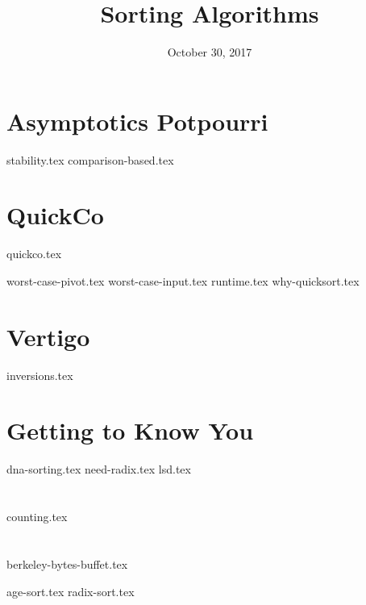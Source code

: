 \documentclass[11pt]{exam}
\title{Sorting Algorithms}
\date{October 30, 2017}
\begin{document}
\maketitle

\section{Asymptotics Potpourri}
{stability.tex}
{comparison-based.tex}

\section{QuickCo}
{quickco.tex}
\begin{questions}
{worst-case-pivot.tex}
{worst-case-input.tex}
{runtime.tex}
{why-quicksort.tex}
\end{questions}

\section{Vertigo}
\begin{questions}
{inversions.tex}
\end{questions}

\clearpage

\section{Getting to Know You}
\begin{questions}
{dna-sorting.tex}
{need-radix.tex}
{lsd.tex}
\end{questions}

\section{}
{counting.tex}

\section{}
{berkeley-bytes-buffet.tex}
\begin{questions}
{age-sort.tex}
{radix-sort.tex}
\end{questions}
\end{document}

